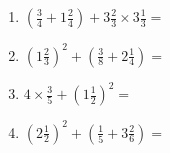 \documentclass[12pt]{article}
\begin{document}
\begin{enumerate}
\item \large $ (\frac{3}{4} + 1 \frac{2}{4}) + 3 \frac{2}{3} \times 3 \frac{1}{3} = $ \vspace{1.8cm}
\item \large $ (1 \frac{2}{3})^2 + (\frac{3}{8} + 2 \frac{1}{4}) = $ \vspace{1.8cm}
\item \large $ 4 \times \frac{3}{5} + (1 \frac{1}{2})^2 = $ \vspace{1.8cm}
\item \large $ (2 \frac{1}{2})^2 + (\frac{1}{5} + 3 \frac{2}{6}) = $ \vspace{1.8cm}
\end{enumerate}\newpage
\end{document}
